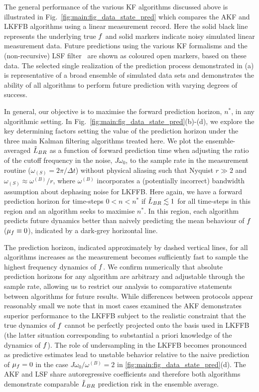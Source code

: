 The general performance of the various KF algorithms discussed above is illustrated in Fig.~\ref{fig:main:fig_data_state_pred} which compares the AKF and LKFFB algorithms using a linear measurement record.  Here the solid black line represents the underlying true $f$ and solid markers indicate noisy simulated linear measurement data.  Future predictions using the various KF formalisms and the (non-recursive) LSF filter~\cite{mavadia2017} are shown as coloured open markers, based on these data.  The selected single realization of the prediction process demonstrated in (a) is representative of a broad ensemble of simulated data sets and demonstrates the ability of all algorithms to perform future prediction with varying degrees of success.  


In general, our objective is to maximise the forward prediction horizon, $n^{*}$, in any algorithmic setting.  In Fig.~\ref{fig:main:fig_data_state_pred}(b)-(d), we explore the key determining factors setting the value of the prediction horizon under the three main Kalman filtering algorithms treated here.  We plot the ensemble-averaged $\tilde{L}_{BR}$ as a function of forward prediction time when adjusting the ratio of the cutoff frequency in the noise, $J\omega_{0}$, to the sample rate in the measurement routine ($\omega_{(S)}=2\pi/\Delta t$) without physical aliasing such that Nyquist $r \gg2$ and $\omega_{(S)} \approx \omega^{(B)} / r$, where $\omega^{(B)}$ incorporates a (potentially incorrect) bandwidth assumption about dephasing noise for LKFFB. Here again, we have a forward prediction horizon for time-steps $0 < n < n^*$ if $\tilde{L}_{BR}\lesssim 1$ for all time-steps in this region and an algorithm seeks to maximise $n^*$. In this region, each algorithm predicts future dynamics better than naively predicting the mean behaviour of $f$ ($\mu_f \equiv 0$), indicated by a dark-grey horizontal line.

The prediction horizon, indicated approximately by dashed vertical lines, for all algorithms increases as the measurement becomes sufficiently fast to sample the highest frequency dynamics of $f$.  We confirm numerically that absolute prediction horizons for any algorithm are arbitrary and adjustable through the sample rate, allowing us to restrict our analysis to comparative statements between algorithms for future results.  While differences between protocols appear reasonably small we note that in most cases examined the AKF demonstrates superior performance to the LKFFB subject to the realistic constraint that the true dynamics of $f$ cannot be perfectly projected onto the basis used in LKFFB (the latter situation corresponding to substantial a priori knowledge of the dynamics of $f$).  The role of undersampling in the LKFFB becomes pronounced as predictive estimates lead to unstable behavior relative to the naive prediction of $\mu_f = 0$ in the case $J\omega_{0}/\omega^{(B)}=2$ in \cref{fig:main:fig_data_state_pred}(d).  The AKF and LSF share autoregressive coefficients and therefore both algorithms demonstrate comparable $\tilde{L}_{BR}$ prediction risk in the ensemble average.

